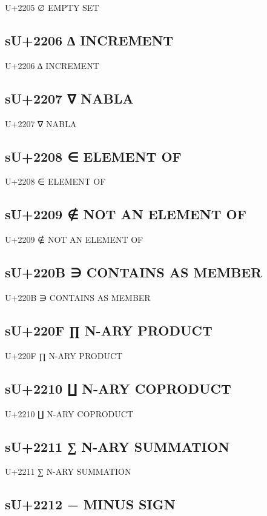 U+2205 ∅ EMPTY SET

\subsection{sU+2206 ∆ INCREMENT}

U+2206 ∆ INCREMENT

\subsection{sU+2207 ∇ NABLA}

U+2207 ∇ NABLA

\subsection{sU+2208 ∈ ELEMENT OF}

U+2208 ∈ ELEMENT OF

\subsection{sU+2209 ∉ NOT AN ELEMENT OF}

U+2209 ∉ NOT AN ELEMENT OF

\subsection{sU+220B ∋ CONTAINS AS MEMBER}

U+220B ∋ CONTAINS AS MEMBER

\subsection{sU+220F ∏ N-ARY PRODUCT}

U+220F ∏ N-ARY PRODUCT

\subsection{sU+2210 ∐ N-ARY COPRODUCT}

U+2210 ∐ N-ARY COPRODUCT

\subsection{sU+2211 ∑ N-ARY SUMMATION}

U+2211 ∑ N-ARY SUMMATION

\subsection{sU+2212 − MINUS SIGN}


